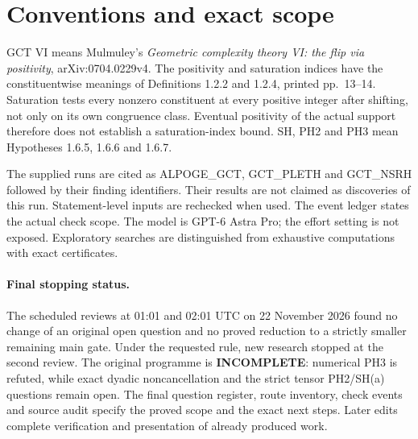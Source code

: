 \documentclass[11pt]{article}
\theoremstyle{definition}\newtheorem{definition}[theorem]{Definition}
\theoremstyle{remark}\newtheorem{remark}[theorem]{Remark}
\begin{document}
\section{Conventions and exact scope}
GCT VI means Mulmuley's \emph{Geometric complexity theory VI: the flip
via positivity}, arXiv:0704.0229v4. The positivity and saturation indices
have the constituentwise meanings of Definitions 1.2.2 and 1.2.4,
printed pp.~13--14. Saturation tests every nonzero constituent at every
positive integer after shifting, not only on its own congruence class.
Eventual positivity of the actual support therefore does not establish
a saturation-index bound. SH, PH2 and PH3 mean Hypotheses 1.6.5,
1.6.6 and 1.6.7.

The supplied runs are cited as ALPOGE\_GCT, GCT\_PLETH and
GCT\_NSRH followed by their finding identifiers. Their results are not
claimed as discoveries of this run. Statement-level inputs are rechecked
when used. The event ledger states the actual check scope. The model is
GPT-6 Astra Pro; the effort setting is not exposed. Exploratory searches
are distinguished from exhaustive computations with exact certificates.

\paragraph{Final stopping status.}
The scheduled reviews at 01:01 and 02:01 UTC on 22 November 2026
found no change of an original open question and no proved reduction
to a strictly smaller remaining main gate. Under the requested rule,
new research stopped at the second review. The original programme is
\textbf{INCOMPLETE}: numerical PH3 is refuted, while exact dyadic
noncancellation and the strict tensor PH2/SH(a) questions remain open.
The final question register, route inventory, check events and source
audit specify the proved scope and the exact next steps. Later edits
complete verification and presentation of already produced work.
\end{document}
